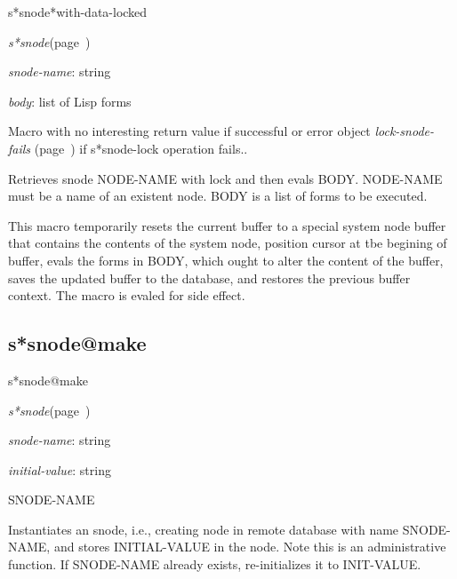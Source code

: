 \begin{description}
\item [Name:]  s*snode*with-data-locked

\item [Class:]
{\sl s*snode}\hfill(page~\pageref{s*snode})

\item [Parameters:]
\item {\sl snode-name}:  string

\item {\sl body}:  list of Lisp forms


\item [Return-value:]
Macro with no interesting return value if successful or
error object {\sl lock-snode-fails} (page~\pageref{lock-snode-fails}) if s*snode-lock 
operation fails..

\item [Description:]
Retrieves snode NODE-NAME with lock and then evals BODY.
NODE-NAME must be a name of an existent node.  
BODY is a list of forms to be executed.  

This macro temporarily resets the current buffer to a
special system node buffer that contains the contents of
the system node, position cursor at tbe begining of
buffer, evals the forms in BODY, which ought to alter
the content of the buffer, saves the updated buffer to
the database, and restores the previous buffer context.
The macro is evaled for side effect.


\item [Public:]



\end{description}
\horizontalline

\subsection{s*snode@make}
\label{s*snode@make}

\begin{description}
\item [Name:]  s*snode@make

\item [Class:]
{\sl s*snode}\hfill(page~\pageref{s*snode})

\item [Parameters:]
\item {\sl snode-name}:  string

\item {\sl initial-value}:  string


\item [Return-value:] SNODE-NAME

\item [Description:]
Instantiates an snode, i.e., creating node in remote
database with name SNODE-NAME, and stores INITIAL-VALUE
in the node. Note this is an administrative function. If
SNODE-NAME already exists, re-initializes it to
INIT-VALUE.

\item [Public:]



\end{description}
\horizontalline

